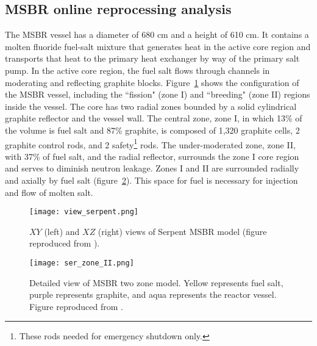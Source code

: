\subsection{MSBR online reprocessing analysis} \label{sec:msbr_reproc}
The \gls{MSBR} vessel has a diameter of 680 cm and a height of 610 cm. It 
contains a molten fluoride fuel-salt mixture that generates heat in the active 
core region and transports that heat to the primary heat exchanger by way of 
the primary salt pump. In the active core region, the fuel salt flows through 
channels in moderating and reflecting graphite blocks.  
Figure~\ref{fig:serpent_plan_view} shows the configuration of the 
\gls{MSBR} vessel, including the ``fission" (zone I) and ``breeding" 
(zone II) regions inside the vessel. The core has two radial zones bounded by 
a solid cylindrical graphite reflector and the vessel wall. The central zone, 
zone I, in which 13\% of the volume is fuel salt and 87\% graphite, is
composed of 1,320 graphite cells, 2 graphite control rods, and 2 
safety\footnote{ These rods needed for emergency shutdown only.} rods. The 
under-moderated zone, zone II, with 37\% of fuel salt, and the radial 
reflector, surrounds the zone I core region and serves to diminish neutron 
leakage. Zones I and II are surrounded radially and axially by fuel salt 
(figure~\ref{fig:serpent_zoneII}). This space for fuel is necessary for 
injection and flow of molten salt.
\begin{figure}[ht!] %
	\centering
	\texttt{[image: view\_serpent.png]}
	\caption{$XY$ (left) and $XZ$ (right) views of Serpent \gls{MSBR} model 
		(figure reproduced from \cite{rykhlevskii_full-core_2017}).}
	\label{fig:serpent_plan_view}
\end{figure}
\begin{figure}[hb!] %
	\centering
	\texttt{[image: ser\_zone\_II.png]}
	\caption{Detailed view of \gls{MSBR} two zone model. 
		Yellow represents fuel salt, purple represents graphite, and aqua 
		represents the reactor vessel. Figure reproduced from 
		\cite{rykhlevskii_full-core_2017}.}
	\label{fig:serpent_zoneII}
\end{figure}

